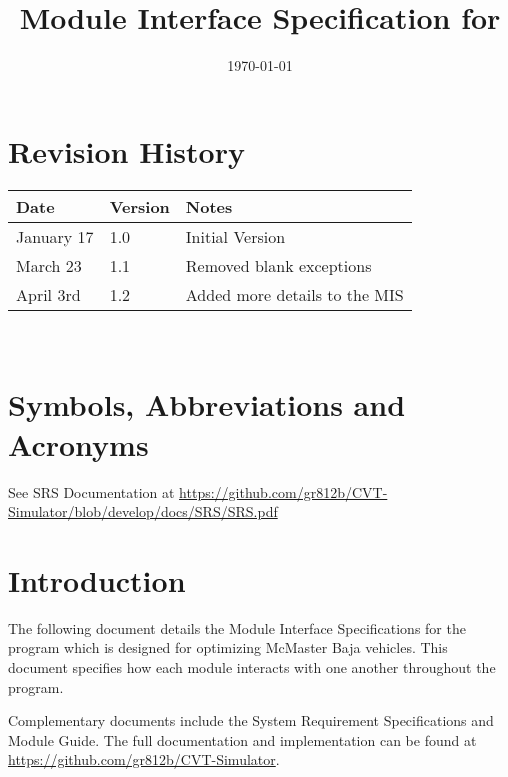 \documentclass[12pt, titlepage]{article}
\begin{document}
\title{Module Interface Specification for \progname{}}

\author{\authname}

\date{\today}

\maketitle


\section{Revision History}

\begin{tabularx}{\textwidth}{p{3cm}p{2cm}X}
\toprule {\bf Date} & {\bf Version} & {\bf Notes}\\
\midrule
January 17 & 1.0 & Initial Version\\
March 23 & 1.1 & Removed blank exceptions\\
April 3rd & 1.2 & Added more details to the MIS\\
\bottomrule
\end{tabularx}

~\newpage

\section{Symbols, Abbreviations and Acronyms}

See SRS Documentation at \url{https://github.com/gr812b/CVT-Simulator/blob/develop/docs/SRS/SRS.pdf}

\newpage

\tableofcontents

\newpage


\section{Introduction}

The following document details the Module Interface Specifications for
the \progname program which is designed for optimizing McMaster Baja vehicles. 
This document specifies how each module interacts with one another throughout the program. 

Complementary documents include the System Requirement Specifications
and Module Guide.  The full documentation and implementation can be
found at \url{https://github.com/gr812b/CVT-Simulator}.
\end{document}
